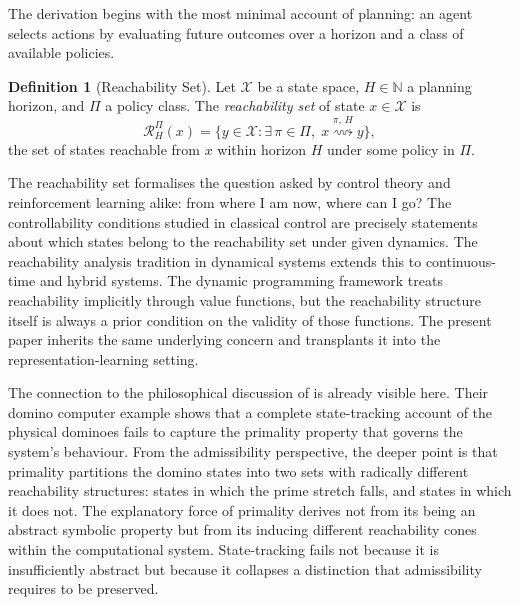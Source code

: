 \documentclass[11pt, a4paper]{article}
\theoremstyle{plain}
\theoremstyle{definition}
\newtheorem{definition}{Definition}
\theoremstyle{remark}
\newcommand{\RHP}{\mathcal{R}_H^\Pi}
\begin{document}
The derivation begins with the most minimal account of planning: an agent selects
actions by evaluating future outcomes over a horizon and a class of available
policies.

\begin{definition}[Reachability Set]
\label{def:reach}
Let $\mathcal{X}$ be a state space, $H \in \mathbb{N}$ a planning horizon, and
$\Pi$ a policy class. The \emph{reachability set} of state $x \in \mathcal{X}$
is
\begin{equation}
  \RHP(x)
  = \bigl\{ y \in \mathcal{X}
    : \exists\, \pi \in \Pi,\;
    x \overset{\pi,\,H}{\rightsquigarrow} y
    \bigr\},
\end{equation}
the set of states reachable from $x$ within horizon $H$ under some policy
in $\Pi$.
\end{definition}

The reachability set formalises the question asked by control theory and
reinforcement learning alike: from where I am now, where can I go? The
controllability conditions studied in classical control \citep{kalman1960general}
are precisely statements about which states belong to the reachability set under
given dynamics. The reachability analysis tradition in dynamical systems
\citep{tomlin2003computational} extends this to continuous-time and hybrid
systems. The dynamic programming framework \citep{bertsekas2012dynamic} treats
reachability implicitly through value functions, but the reachability structure
itself is always a prior condition on the validity of those functions. The present
paper inherits the same underlying concern and transplants it into the
representation-learning setting.

The connection to the philosophical discussion of \citet{gupta2025world} is
already visible here. Their domino computer example shows that a complete
state-tracking account of the physical dominoes fails to capture the primality
property that governs the system's behaviour. From the admissibility perspective,
the deeper point is that primality partitions the domino states into two sets
with radically different reachability structures: states in which the prime stretch
falls, and states in which it does not. The explanatory force of primality derives
not from its being an abstract symbolic property but from its inducing different
reachability cones within the computational system. State-tracking fails not
because it is insufficiently abstract but because it collapses a distinction that
admissibility requires to be preserved.
\end{document}
